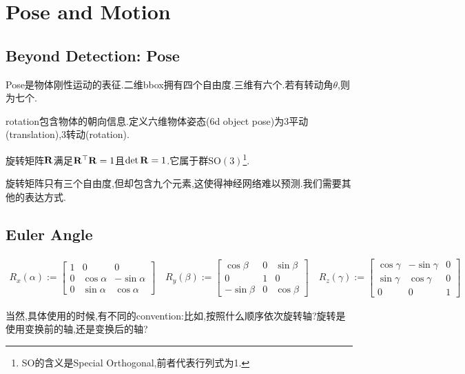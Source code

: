 \section{Pose and Motion}

\subsection{Beyond Detection: Pose}

Pose是物体刚性运动的表征.二维bbox拥有四个自由度.三维有六个.若有转动角$\theta$,则为七个.

rotation包含物体的朝向信息.定义六维物体姿态(6d object pose)为3平动(translation),3转动(rotation).

旋转矩阵$\bold{R}$满足$\bold{R}^\top\bold{R} = 1$且$\det \bold{R} = 1$.它属于群$\mathrm{SO(3)}$\footnote{SO的含义是Special Orthogonal,前者代表行列式为1.}.

旋转矩阵只有三个自由度,但却包含九个元素,这使得神经网络难以预测.我们需要其他的表达方式.

\subsection{Euler Angle}
\begin{equation}
    \begin{array}{l}
        R_{x}(\alpha):=\left[\begin{array}{ccc}
            1 & 0 & 0 \\
            0 & \cos \alpha & -\sin \alpha \\
            0 & \sin \alpha & \cos \alpha
        \end{array}\right] \quad
        R_{y}(\beta):=\left[\begin{array}{ccc}
            \cos \beta & 0 & \sin \beta \\
            0 & 1 & 0 \\
            -\sin \beta & 0 & \cos \beta
        \end{array}\right] \quad
        R_{z}(\gamma):=\left[\begin{array}{ccc}
            \cos \gamma & -\sin \gamma & 0 \\
            \sin \gamma & \cos \gamma & 0 \\
            0 & 0 & 1
        \end{array}\right]
    \end{array}
\end{equation}

当然,具体使用的时候,有不同的convention:比如,按照什么顺序依次旋转轴?旋转是使用变换前的轴,还是变换后的轴?

